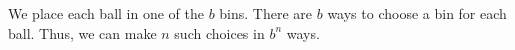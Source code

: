 We place each ball in one of the $b$ bins.
There are $b$ ways to choose a bin for each ball.
Thus, we can make $n$ such choices in $b^n$ ways.
